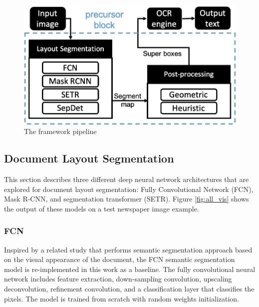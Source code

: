 \documentclass[letterpaper]{article} %
\begin{document}
\begin{figure}[h]
   \centering
\includegraphics[scale=0.45]{LaTeX/Figures/block_diagram_v7.png}
   \caption{The framework pipeline}
   \label{fig:block_diagram}
 \end{figure}
 
\subsection{Document Layout Segmentation}
This section describes three different deep neural network architectures that are explored for document layout segmentation: Fully Convolutional Network (FCN), Mask R-CNN, and segmentation transformer (SETR). Figure \ref{fig:all_vis} shows the output of these models on a test newspaper image example.



\subsubsection{FCN}
Inspired by a related study \cite{DBLP:conf/icdar/MeierSSAC17} that performs semantic segmentation approach based on the visual appearance of the document, the FCN semantic segmentation model is re-implemented in this work as a baseline. The fully convolutional neural network includes feature extraction, down-sampling convolution, upscaling deconvolution, refinement convolution, and a classification layer that classifies the pixels. The model is trained from scratch with random weights initialization.
\end{document}
